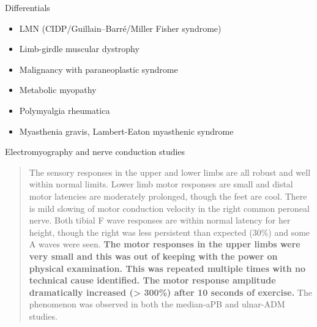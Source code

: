 \documentclass[
  ignorenonframetext,
]{beamer}
\providecommand{\tightlist}{%
  \setlength{\itemsep}{0pt}\setlength{\parskip}{0pt}}
\begin{document}
\begin{frame}{Differentials}
\protect\hypertarget{differentials}{}
\begin{itemize}
\tightlist
\item
  LMN (CIDP/Guillain--Barré/Miller Fisher syndrome)
\item
  Limb-girdle muscular dystrophy
\item
  Malignancy with paraneoplastic syndrome
\item
  Metabolic myopathy
\item
  Polymyalgia rheumatica
\item
  Myasthenia gravis, Lambert-Eaton myasthenic syndrome
\end{itemize}
\end{frame}

\begin{frame}{Electromyography and nerve conduction studies}
\protect\hypertarget{electromyography-and-nerve-conduction-studies}{}
\begin{quote}
The sensory responses in the upper and lower limbs are all robust and
well within normal limits. Lower limb motor responses are small and
distal motor latencies are moderately prolonged, though the feet are
cool. There is mild slowing of motor conduction velocity in the right
common peroneal nerve. Both tibial F wave responses are within normal
latency for her height, though the right was less persistent than
expected (30\%) and some A waves were seen. \textbf{The motor responses
in the upper limbs were very small and this was out of keeping with the
power on physical examination. This was repeated multiple times with no
technical cause identified. The motor response amplitude dramatically
increased (\textgreater{} 300\%) after 10 seconds of exercise.} The
phenomenon was observed in both the median-aPB and ulnar-ADM studies.
\end{quote}


\end{frame}
\end{document}
